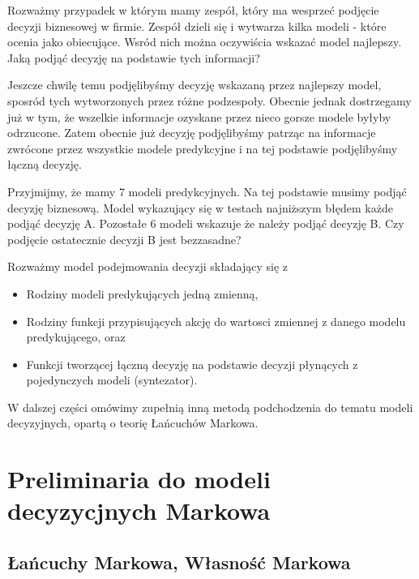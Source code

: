 \documentclass[10pt,a4paper]{book}
\begin{document}
\begin{problem*}
Rozważmy przypadek w którym mamy zespół, który ma wesprzeć podjęcie decyzji biznesowej w firmie. Zespół dzieli się i wytwarza kilka modeli - które ocenia jako obiecujące. Wsród nich można oczywiścia wskazać model najlepszy. Jaką podjąć decyzję na podstawie tych informacji?
\end{problem*}

Jeszcze chwilę temu podjęlibyśmy decyzję wskazaną przez najlepszy model, sposród tych wytworzonych przez różne podzespoły. Obecnie jednak dostrzegamy już w tym, że wszelkie informacje ozyskane przez nieco gorsze modele byłyby odrzucone. Zatem obecnie już decyzję podjęlibyśmy patrząc na informacje zwrócone przez wszystkie modele predykcyjne i na tej podstawie podjęlibyśmy łączną decyzję.

\begin{problem*}
Przyjmijmy, że mamy 7 modeli predykcyjnych. Na tej podstawie musimy podjąć decyzję biznesową. Model wykazujący się w testach najniższym błędem każde podjąć decyzję A. Pozostałe 6 modeli wskazuje że należy podjąć decyzję B. Czy podjęcie ostatecznie decyzji B jest bezzasadne?
\end{problem*}

\begin{definition}
Rozważmy model podejmowania decyzji składający się z 
\begin{itemize}
\item Rodziny modeli predykujących jedną zmienną,
\item Rodziny funkcji przypisujących akcję do wartosci zmiennej z danego modelu predykującego, oraz
\item Funkcji tworzącej łączną decyzję na podstawie decyzji płynących z pojedynczych modeli (syntezator).
\end{itemize}
\end{definition}

W dalszej części omówimy zupełnią inną metodą podchodzenia do tematu modeli decyzyjnych, opartą o teorię Łańcuchów Markowa.

\section{Preliminaria do modeli decyzycjnych Markowa}

\subsection{Łańcuchy Markowa, Własność Markowa}
\end{document}

